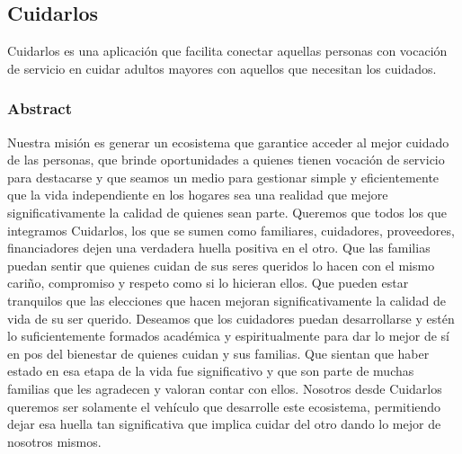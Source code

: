 \documentclass[a4paper,12pt]{article}
\begin{document}
    \subsection{Cuidarlos}
    Cuidarlos es una aplicación que facilita conectar aquellas personas con vocación de servicio en cuidar adultos mayores con aquellos que necesitan los cuidados.
    \subsubsection{Abstract}
    Nuestra misión es generar un ecosistema que garantice acceder al mejor cuidado de las personas, que brinde oportunidades a quienes tienen vocación de servicio para destacarse y que seamos un medio para gestionar simple y eficientemente que la vida independiente en los hogares sea una realidad que mejore significativamente la calidad de quienes sean parte. \newline
    Queremos que todos los que integramos Cuidarlos, los que se sumen como familiares, cuidadores, proveedores, financiadores dejen una verdadera huella positiva en el otro. Que las familias puedan sentir que quienes cuidan de sus seres queridos lo hacen con el mismo cariño, compromiso y respeto como si lo hicieran ellos. Que pueden estar tranquilos que las elecciones que hacen mejoran significativamente la calidad de vida de su ser querido. Deseamos que los cuidadores puedan desarrollarse y estén lo suficientemente formados académica y espiritualmente para dar lo mejor de sí en pos del bienestar de quienes cuidan y sus familias. Que sientan que haber estado en esa etapa de la vida fue significativo y que son parte de muchas familias que les agradecen y valoran contar con ellos. \newline
    Nosotros desde Cuidarlos queremos ser solamente el vehículo que desarrolle este ecosistema, permitiendo dejar esa huella tan significativa que implica cuidar del otro dando lo mejor de nosotros mismos.\cite{Cuidarlos}
\end{document}
